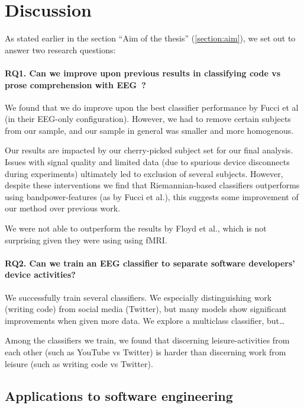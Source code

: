 \section{Discussion}\label{section:discussion}

As stated earlier in the section ``Aim of the thesis'' (\ref{section:aim}), we set out to answer two research questions:

\paragraph*{RQ1. Can we improve upon previous results in classifying code vs prose comprehension with EEG~?}

We found that we do improve upon the best classifier performance by Fucci et al (in their EEG-only configuration). However, we had to remove certain subjects from our sample, and our sample in general was smaller and more homogenous. 

Our results are impacted by our cherry-picked subject set for our final analysis. Issues with signal quality and limited data (due to spurious device disconnects during experiments) ultimately led to exclusion of several subjects. However, despite these interventions we find that Riemannian-based classifiers outperforms using bandpower-features (as by Fucci et al.), this suggests some improvement of our method over previous work.

We were not able to outperform the results by Floyd et al., which is not surprising given they were using using fMRI\@.

\paragraph*{RQ2. Can we train an EEG classifier to separate software developers’ device activities?}

We successfully train several classifiers. We especially distinguishing work (writing code) from social media (Twitter), but many models show significant improvements when given more data. We  explore a multiclass classifier, but\ldots

Among the classifiers we train, we found that discerning leisure-activities from each other (such as YouTube vs Twitter) is harder than discerning work from leisure (such as writing code vs Twitter).


\subsection{Applications to software engineering}


